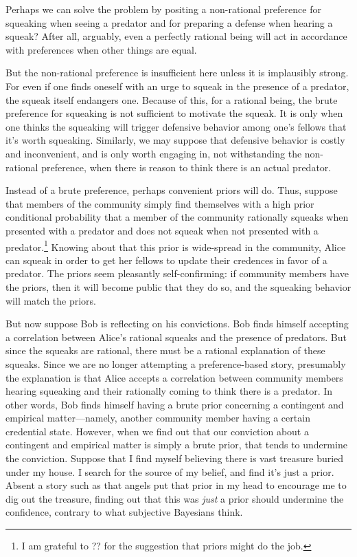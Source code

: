 Perhaps we can solve the problem by positing a non-rational preference for squeaking when seeing a predator and for
preparing a defense when hearing a squeak? After all, arguably, even a perfectly rational being will act in accordance
with preferences when other things are equal. 

But the non-rational preference is insufficient here unless it is implausibly strong. For even if one finds oneself
with an urge to squeak in the presence of a predator, the squeak itself endangers one. Because of this, for a rational
being, the brute preference for squeaking is not sufficient to motivate the squeak. It is only when one thinks the
squeaking will trigger defensive behavior among one's fellows that it's worth squeaking. Similarly, we may suppose that
defensive behavior is costly and inconvenient, and is only worth engaging in, not withstanding the non-rational preference,
when there is reason to think there is an actual predator.

Instead of a brute preference, perhaps convenient priors will do. Thus, suppose that members of the community simply find
themselves with a high prior conditional probability that a member of the community rationally squeaks when presented with a 
predator and does not squeak when not presented with a predator.\footnote{I am grateful to ?? for the suggestion that
priors might do the job.} Knowing about that this prior is wide-spread in the community, Alice can squeak in order to 
get her fellows to update their credences in favor of a predator. The priors seem pleasantly self-confirming: if community
members have the priors, then it will become public that they do so, and the squeaking behavior will match the priors.

But now suppose Bob is reflecting on his convictions. Bob finds himself accepting a correlation between Alice's rational 
squeaks and the presence of predators. But since the squeaks are rational, there must be a rational explanation of these 
squeaks. Since we are no longer attempting a preference-based story, presumably the explanation is that Alice accepts a 
correlation between community members hearing squeaking and their rationally coming to think there is a predator. In other
words, Bob finds himself having a brute prior concerning a contingent and empirical matter---namely, another community
member having a certain credential state.  However, when we find out that our conviction about a contingent and empirical 
matter is simply a brute prior, that tends to undermine the conviction. Suppose that I find myself believing there is vast treasure buried under my house. I search
for the source of my belief, and find it's just a prior. Absent a story such as that angels put that prior in my head
to encourage me to dig out the treasure, finding out that this was \textit{just} a prior should undermine the confidence,
contrary to what subjective Bayesians think. 


